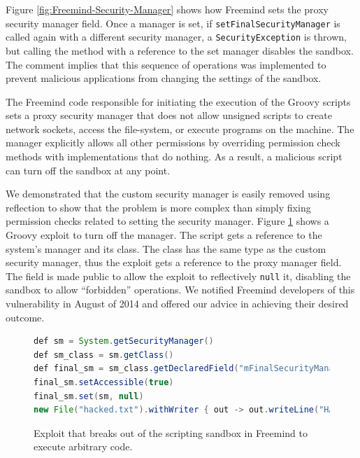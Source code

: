 \documentclass{sig-alternate}
\begin{document}
Figure \ref{fig:Freemind-Security-Manager} shows how Freemind sets
the proxy security manager field.
Once a manager is set, if \texttt{setFinalSecurityManager} is called
again with a different security manager, a \texttt{SecurityException}
is thrown, but calling the method with a reference to the set manager disables
the sandbox. The comment implies that this sequence
of operations was implemented to prevent malicious applications from
changing the settings of the sandbox.

The Freemind code responsible for initiating the execution of the
Groovy scripts sets a proxy security manager that does not allow unsigned
scripts to create network sockets, access the file-system, or execute
programs on the machine. The manager explicitly allows all other permissions by overriding permission check methods with implementations that do nothing. As a result, a malicious script can turn off the sandbox at any point.

We demonstrated that the custom security manager is easily removed
using reflection to show that the problem is more complex than simply
fixing permission checks related to setting the security manager. Figure \ref{fig:Example-Exploit-for-Freemind}
shows a Groovy exploit to turn off the manager. The script gets a reference to the system's manager
and its class. The class has the same type as the custom security
manager, thus the exploit gets a reference to the proxy manager field.
The field is made public to allow the exploit to reflectively \texttt{null}
it, disabling the sandbox to allow ``forbidden'' operations.
We notified Freemind developers of this vulnerability in August of 2014 
and offered our advice in achieving
their desired outcome. 

\begin{figure}
\begin{lstlisting}[language=Java,basicstyle={\scriptsize},breaklines=true]
def sm = System.getSecurityManager() 
def sm_class = sm.getClass() 
def final_sm = sm_class.getDeclaredField("mFinalSecurityManager")
final_sm.setAccessible(true) 
final_sm.set(sm, null)
new File("hacked.txt").withWriter { out -> out.writeLine("HACKED!") }
\end{lstlisting}
\caption{Exploit that breaks out of the scripting sandbox in Freemind\label{fig:Example-Exploit-for-Freemind}
to execute arbitrary code.}
\end{figure}
\end{document}
